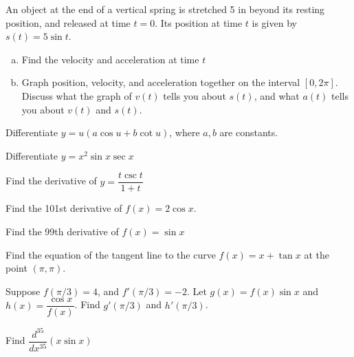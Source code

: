 \documentclass[notes]{subfiles}
\begin{document}
		\begin{ex}
			An object at the end of a vertical spring is stretched 5 in beyond its resting position, and released at time \(t = 0\).  Its position at time \(t\) is given by \(s(t) = 5\sin t\).
			\begin{enumerate}[(a)]
				\item Find the velocity and acceleration at time \(t\)
					
				\item Graph position, velocity, and acceleration together on the interval \([0,2\pi]\). Discuss what the graph of \(v(t)\) tells you about \(s(t)\), and what \(a(t)\) tells you about \(v(t)\) and \(s(t)\).
					
			\end{enumerate}
		\end{ex}

		\begin{ex}
			Differentiate \(y = u(a\cos u + b\cot u)\), where \(a,b\) are constants.
		\end{ex}
			\vs{1}
			
		\begin{ex}
			Differentiate \(y = x^2\sin x\sec x\)
		\end{ex}	
			\newpage
			
		\begin{ex}
			Find the derivative of \(y = \dfrac{t\csc t}{1+t}\)
		\end{ex}	
			
			
		\begin{ex}
			Find the 101st derivative of \(f(x) = 2\cos x\).
		\end{ex}
			\vs{1}
		
		\begin{ex}
			Find the 99th derivative of \(f(x) = \sin x\)
		\end{ex}	
			\vs{1}		
			
		\begin{ex}
			Find the equation of the tangent line to the curve \(f(x) = x+\tan x\) at the point \((\pi,\pi)\).  
		\end{ex}	
			\vs{1}
			\newpage

		\begin{ex}
			Suppose \(f(\pi/3) = 4\), and \(f'(\pi/3) = -2\).  Let \(g(x) = f(x)\sin x\) and \(h(x) = \dfrac{\cos x}{f(x)}\).  Find \(g'(\pi/3)\) and \(h'(\pi/3)\).
		\end{ex}
			
		\begin{ex}
			Find \(\dfrac{d^{35}}{dx^{35}} (x\sin x)\)
		\end{ex}
			\newpage
				
\end{document}
